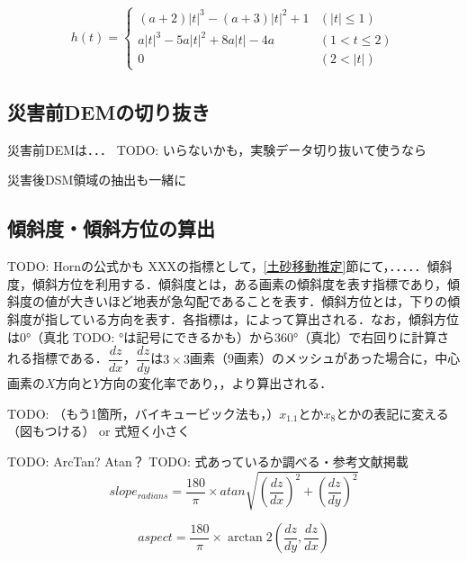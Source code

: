           \begin{eqnarray}
            \label{バイキュービック法3}
              h(t) = 
              \left\{
                \begin{array}{ll}
                  (a + 2) |t|^3 - (a + 3)|t|^2 + 1 & (|t| \leq 1)   \\
                  a|t|^3 - 5a|t|^2 + 8a|t| - 4a    & (1 < t \leq 2) \\
                  0                                & (2 < |t|)
                \end{array}
              \right.
            \end{eqnarray}
  
    \subsection{災害前DEMの切り抜き}
      災害前DEMは．．．
      TODO: いらないかも，実験データ切り抜いて使うなら

      災害後DSM領域の抽出も一緒に

    \subsection{傾斜度・傾斜方位の算出}
    TODO: Hornの公式かも
      XXXの指標として，\ref{土砂移動推定}節にて，．．．．．傾斜度，傾斜方位を利用する．傾斜度とは，ある画素の傾斜度を表す指標であり，傾斜度の値が大きいほど地表が急勾配であることを表す．傾斜方位とは，下りの傾斜度が指している方向を表す．各指標は，によって算出される．なお，傾斜方位は0°（真北 TODO: °は記号にできるかも）から360°（真北）で右回りに計算される指標である．$\dfrac{dz}{dx}$，$\dfrac{dz}{dy}$は$3 \times 3$画素（9画素）のメッシュがあった場合に，中心画素の$X$方向と$Y$方向の変化率であり，，より算出される．

      TODO: （もう1箇所，バイキュービック法も，）$x_{1.1}$とか$x_{8}$とかの表記に変える（図もつける） or 式短く小さく

      TODO: ArcTan? Atan？
      TODO: 式あっているか調べる・参考文献掲載
      \begin{equation}
        \label{傾斜度}
        slope_{radians} = 
        \dfrac{180} {\pi} \times
        atan \sqrt{
          (\dfrac{dz}{dx})^2 + (\dfrac{dz}{dy})^2
        }
      \end{equation}

      \begin{equation}
        \label{傾斜方位}
        aspect = 
        \dfrac{180} {\pi} \times
        \arctan 2 (\dfrac{dz}{dy}, \dfrac{dz}{dx})
      \end{equation}

